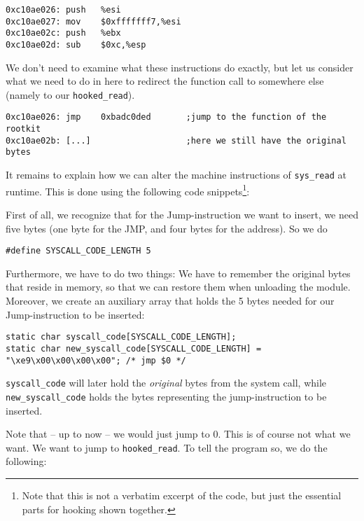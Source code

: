 \documentclass[10pt, letterpaper]{article}
\begin{document}
\begin{verbatim}
0xc10ae026:	push   %esi
0xc10ae027:	mov    $0xfffffff7,%esi
0xc10ae02c:	push   %ebx
0xc10ae02d:	sub    $0xc,%esp
\end{verbatim}

We don't need to examine what these instructions do exactly, but let us consider what we need to do in here to redirect the function call to somewhere else (namely to our \texttt{hooked\_read}).

\begin{verbatim}
0xc10ae026:	jmp    0xbadc0ded       ;jump to the function of the rootkit
0xc10ae02b:	[...]                   ;here we still have the original bytes
\end{verbatim}

It remains to explain how we can alter the machine instructions of \texttt{sys\_read} at runtime. This is done using the following code snippets\footnote{Note that this is not a verbatim excerpt of the code, but just the essential parts for hooking shown together.}:

First of all, we recognize that for the Jump-instruction we want to insert, we need five bytes (one byte for the JMP, and four bytes for the address). So we do

\begin{verbatim}
#define SYSCALL_CODE_LENGTH 5
\end{verbatim}

Furthermore, we have to do two things: We have to remember the original bytes that reside in memory, so that we can restore them when unloading the module. Moreover, we create an auxiliary array that holds the 5 bytes needed for our Jump-instruction to be inserted:

\begin{verbatim}
static char syscall_code[SYSCALL_CODE_LENGTH];
static char new_syscall_code[SYSCALL_CODE_LENGTH] = "\xe9\x00\x00\x00\x00"; /* jmp $0 */
\end{verbatim}


\texttt{syscall\_code} will later hold the \emph{original} bytes from the system call, while \texttt{new\_syscall\_code} holds the bytes representing the jump-instruction to be inserted. 

Note that -- up to now -- we would just jump to 0. This is of course not what we want. We want to jump to \texttt{hooked\_read}. To tell the program so, we do the following:
\end{document}

